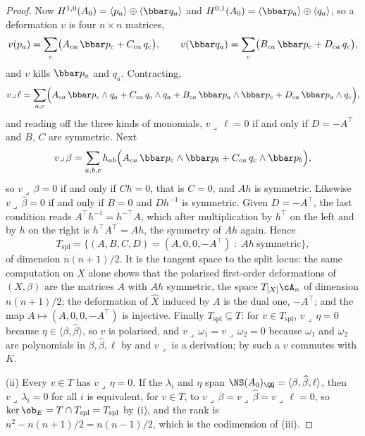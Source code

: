 \begin{proof}
Now $H^{1,0}(A_{0})=\langle p_{a}\rangle\oplus\langle\bbar q_{a}\rangle$ and
$H^{0,1}(A_{0})=\langle\bbar p_{a}\rangle\oplus\langle q_{a}\rangle$, so a
deformation $v$ is four $n\times n$ matrices,
\[
  v(p_{a})=\sum_{c}\bigl(A_{ca}\,\bbar p_{c}+C_{ca}\,q_{c}\bigr),
  \qquad
  v(\bbar q_{a})=\sum_{c}\bigl(B_{ca}\,\bbar p_{c}+D_{ca}\,q_{c}\bigr),
\]
and $v$ kills $\bbar p_{a}$ and $q_{a}$. Contracting,
\[
  v\lrcorner\,\ell
  =\sum_{a,c}\Bigl(A_{ca}\,\bbar p_{c}\wedge q_{a}+C_{ca}\,q_{c}\wedge q_{a}
   +B_{ca}\,\bbar p_{a}\wedge\bbar p_{c}+D_{ca}\,\bbar p_{a}\wedge q_{c}\Bigr),
\]
and reading off the three kinds of monomials, $v\lrcorner\,\ell=0$ if and only
if $D=-A^{\top}$ and $B$, $C$ are symmetric. Next
\[
  v\lrcorner\,\beta
  =\sum_{a,b,c}h_{ab}\Bigl(A_{ca}\,\bbar p_{c}\wedge\bbar p_{b}
   +C_{ca}\,q_{c}\wedge\bbar p_{b}\Bigr),
\]
so $v\lrcorner\,\beta=0$ if and only if $Ch=0$, that is $C=0$, and $Ah$ is
symmetric. Likewise $v\lrcorner\,\widehat\beta=0$ if and only if $B=0$ and
$Dh^{-1}$ is symmetric. Given $D=-A^{\top}$, the last condition reads
$A^{\top}h^{-1}=h^{-\top}A$, which after multiplication by $h^{\top}$ on the
left and by $h$ on the right is $h^{\top}A^{\top}=Ah$, the symmetry of $Ah$
again. Hence
\[
  T_{\mathrm{spl}}=\bigl\{(A,B,C,D)=(A,0,0,-A^{\top})\;:\;Ah\ \text{symmetric}\bigr\},
\]
of dimension $n(n+1)/2$. It is the tangent space to the split locus: the
same computation on $X$ alone shows that the polarised first-order
deformations of $(X,\beta)$ are the matrices $A$ with $Ah$ symmetric, the
space $T_{[X]}\cA_{n}$ of dimension $n(n+1)/2$; the deformation of
$\widehat X$ induced by $A$ is the dual one, $-A^{\top}$; and the map
$A\mapsto(A,0,0,-A^{\top})$ is injective. Finally $T_{\mathrm{spl}}\subseteq
T$: for $v\in T_{\mathrm{spl}}$, $v\lrcorner\,\eta=0$ because
$\eta\in\langle\beta,\widehat\beta\rangle$, so $v$ is polarised, and
$v\lrcorner\,\omega_{1}=v\lrcorner\,\omega_{2}=0$ because $\omega_{1}$ and
$\omega_{2}$ are polynomials in $\beta,\widehat\beta,\ell$ by
 and $v\lrcorner$ is a derivation; by
 such a $v$ commutes with $K$.

(ii) Every $v\in T$ has $v\lrcorner\,\eta=0$. If the $\lambda_{i}$ and
$\eta$ span $\NS(A_{0})_{\QQ}=\langle\beta,\widehat\beta,\ell\rangle$, then
$v\lrcorner\,\lambda_{i}=0$ for all $i$ is equivalent, for $v\in T$, to
$v\lrcorner\,\beta=v\lrcorner\,\widehat\beta=v\lrcorner\,\ell=0$, so
$\ker\ob_{E}=T\cap T_{\mathrm{spl}}=T_{\mathrm{spl}}$ by (i), and the rank
is $n^{2}-n(n+1)/2=n(n-1)/2$, which is the codimension of
(iii).


\end{proof}
